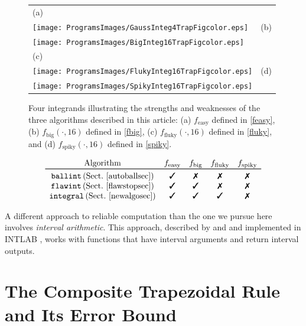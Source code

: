 \documentclass[]{article}
\DeclareMathOperator{\integ}{\texttt{\textup{integral}}}
\DeclareMathOperator{\flawinteg}{\texttt{\textup{flawint}}}
\DeclareMathOperator{\ballinteg}{\texttt{\textup{ballint}}}
\theoremstyle{definition}
\theoremstyle{remark}
\begin{document}
\begin{figure}
\centering 
\begin{tabular}{>{\centering}m{5.5cm}>{\centering}m{5.5cm}}
(a) \\
\texttt{[image: ProgramsImages/GaussInteg4TrapFigcolor.eps]} &
(b) \\
\texttt{[image: ProgramsImages/BigInteg16TrapFigcolor.eps]} \tabularnewline [5ex]
(c) \\
\texttt{[image: ProgramsImages/FlukyInteg16TrapFigcolor.eps]} &
(d) \\
\texttt{[image: ProgramsImages/SpikyInteg16TrapFigcolor.eps]} 
\end{tabular}
\caption{Four integrands illustrating the strengths and weaknesses of the three algorithms described in this article:  (a) $f_{\text{easy}}$ defined in \eqref{feasy}, (b) $f_{\text{big}}(\cdot,16)$ defined in \eqref{fbig},  (c) $f_{\text{fluky}}(\cdot,16)$ defined in \eqref{fluky}, and (d) $f_{\text{spiky}}(\cdot,16)$ defined in \eqref{spiky}. \label{fourintegfig}}
\end{figure}

\begin{table}
\caption{Success () or Failure () of Three Quadrature Algorithms for Four Different Kinds of Integrands Depicted in Figure \ref{fourintegfig}. \label{successtable}}
\[
\begin{array}{ccccc}
\text{Algorithm} & f_{\text{easy}} & f_{\text{big}} &  f_{\text{fluky}} & f_{\text{spiky}} \tabularnewline
\toprule
\ballinteg \text{(Sect.\ \ref{autoballsec})} & \text{\ding{51}} & \text{\ding{55}} & \text{\ding{55}}& \text{\ding{55}} \tabularnewline
\flawinteg \text{(Sect.\ \ref{flawstopsec})} & \text{\ding{51}} & \text{\ding{51}} & \text{\ding{55}}& \text{\ding{55}} \tabularnewline
\integ \text{(Sect.\ \ref{newalgosec})} & \text{\ding{51}} & \text{\ding{51}} & \text{\ding{51}}& \text{\ding{55}} \tabularnewline
\end{array}
\]
\end{table}  

A different approach to reliable computation than the one we pursue here involves \emph{interval arithmetic}. This approach, described by  and  and implemented in INTLAB \cite{Rum99a}, works with functions that have interval arguments and return interval outputs.

\section{The Composite Trapezoidal Rule and Its Error Bound} \label{trapbasicsec}
\end{document}
